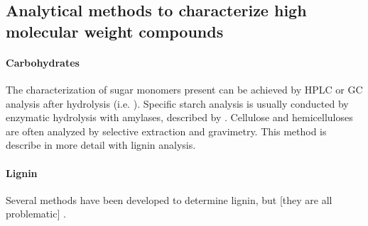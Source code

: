 \subsection{Analytical methods to characterize high molecular weight compounds}

\paragraph{Carbohydrates}
The characterization of sugar monomers present can be achieved by HPLC or GC analysis after hydrolysis (i.e. \cite{Snajdr2011}). Specific starch analysis is usually conducted by enzymatic hydrolysis with amylases, described by \cite{Leitner2011}. Cellulose and hemicelluloses are  often analyzed by selective extraction and gravimetry. This method is describe in more detail with lignin analysis.

\paragraph{Lignin}
Several methods have been developed to determine lignin, but [they are all problematic] \citep{Hatfield2005}.





